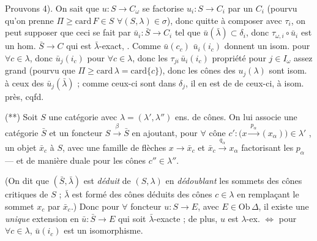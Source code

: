 \documentclass[11pt,a4paper]{article}
\begin{document}
Prouvons 4). On sait que $u : S \to C_{\omega}$ se factorise 
$u_{i} : S \to C_{i}$ par un $C_{i}$ (pourvu qu'on prenne $\Pi \geq
\mathrm{card}\, F \in S$ $\forall (S,\lambda) \in \sigma$), donc quitte à
composer avec $\tau_{i}$, on peut supposer que ceci se fait \ill{} par
$\bar{u}_{i} : \bar{S} \to C_{i}$ tel que $\bar{u}(\bar{\lambda}) \subset
\delta_{i}$, donc $\tau_{\omega,i} \circ \bar{u}_{i}$ est un hom.
$\bar{S} \to C$ qui est $\bar{\lambda}$-exact, .
\struck{\ill{}} Comme $\bar{u}(c_{c})$ \ill{} $\bar{u}_{i}(i_{c})$ donnent un
isom. pour $\forall c \in \lambda$, donc \ill{} $\bar{u}_{j}(i_{c})$ \ill{}
pour $\forall c \in \lambda$, donc les $\tau_{ji}\,\bar{u}_{i}(i_{c})$
\ill{} propriété pour $j \in I_{\omega}$ assez grand (pourvu que
$\Pi \geq \mathrm{card}\,\lambda = \mathrm{card}\{c\}$), donc
\struck{\ill{}} les  cônes des $u_{j}(\lambda)$ sont isom. à
ceux des $\bar{u}_{j}(\bar{\lambda})$ ; comme ceux-ci sont dans $\delta_{j}$,
il en est de \ill{} de ceux-ci, à isom. près, cqfd.


(**) Soit $S$ une catégorie avec $\lambda = (\lambda', \lambda'')$ ens. de
cônes. On lui associe une catégorie $\bar{S}$ et un foncteur
$S \xrightarrow{\ \beta\ } \bar{S}$  en ajoutant, pour
$\forall$  cône
$c' : \bigl(x \xrightarrow{\ p_{\alpha}\ } (x_{\alpha})\bigr) \in \lambda'$
\struck{\ill{}}, un objet $\bar{x}_{c}$ à $S$, avec  une
famille de flèches $x \to \bar{x}_{c}$ et 
$\bar{x}_{c} \xrightarrow{\ q_{\alpha}\ } x_{\alpha}$ factorisant les
$p_{\alpha}$ — et de manière duale pour les cônes $c'' \in \lambda''$.



(On dit que $(\bar{S}, \bar{\lambda})$ est \emph{déduit} de $(S, \lambda)$
en \emph{dédoublant} les sommets des cônes critiques de $S$ ;
$\bar{\lambda}$ est formé des cônes déduits des cônes $c \in \lambda$ en
remplaçant le sommet $x_{c}$ par $\bar{x}_{c}$.) Donc pour $\forall$ foncteur
$u : S \to E$, avec $E \in \mathrm{Ob}\,\Delta$, il existe une
\emph{unique} extension en $\bar{u} : \bar{S} \to E$ qui soit
$\bar{\lambda}$-exacte ; de plus, $u$ est $\lambda$-ex. $\Leftrightarrow$
 pour $\forall c \in \lambda$, $\bar{u}(i_{c})$ est un
isomorphisme.
\end{document}
